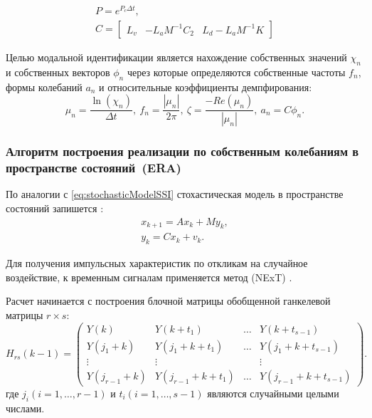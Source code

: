 \begin{gather}
	P = e^{P_c \Delta t}, \\
	C = 
	\begin{bmatrix} 
		L_v & -L_a M^{-1} C_2 & L_d - L_a M^{-1} K
	\end{bmatrix}
\end{gather}

Целью модальной идентификации является нахождение собственных значений $ \chi_n $ и собственных векторов $ \phi_n $ через которые определяются собственные частоты $ f_n $, формы колебаний $ a_n $ и относительные коэффициенты демпфирования:
\begin{equation}
	\mu_n = \frac{\ln(\chi_n)}{\Delta t}, \ f_n = \frac{|\mu_n|}{2 \pi}, \ \zeta = \frac{-Re(\mu_n)}{|\mu_n|}, \ a_n = C \phi_n.
\end{equation}

\subsubsection{Алгоритм построения реализации по собственным колебаниям в пространстве состояний~(ERA)}

По аналогии с \eqref{eq:stochasticModelSSI} стохастическая модель в пространстве состояний запишется \cite{lib:oma:Juang}:
\begin{gather}
	x_{k + 1} = A x_k + M y_k, \\
	y_k = C x_k + v_k.
\end{gather}

Для получения импульсных характеристик по откликам на случайное воздействие, к временным сигналам применяется метод  (NExT) \cite{lib:oma:Lin}. 

Расчет начинается с построения блочной матрицы обобщенной ганкелевой матрицы $ r \times s $:
\begin{equation}
	H_{rs}(k - 1) = 
	\begin{pmatrix}
		Y(k) & Y(k + t_1) & \dots & Y(k + t_{s - 1}) \\
		Y(j_1 + k) & Y(j_1 + k + t_1) & \dots & Y(j_1 + k + t_{s - 1}) \\
		\vdots & \vdots & & \vdots \\
		Y(j_{r - 1} + k) & Y(j_{r - 1} + k + t_1) & \dots & Y(j_{r - 1} + k + t_{s - 1})
	\end{pmatrix}. \label{eq:matrixHankel}
\end{equation}
где $j_i(i = 1, \hdots, r-1) $ и $ t_i(i = 1, \hdots, s - 1) $ являются случайными целыми числами.

